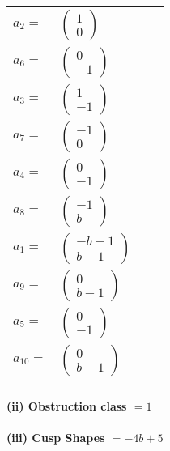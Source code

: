 \documentclass[1p]{elsarticle_modified}
\theoremstyle{definition}
\begin{document}
\begin{tabular}{m{7pt} m{180pt} m{7pt} m{180pt} }
\flushright $a_{2}=$&$\begin{pmatrix}1\\0\end{pmatrix}$ \\
\flushright $a_{6}=$&$\begin{pmatrix}0\\-1\end{pmatrix}$ \\
\flushright $a_{3}=$&$\begin{pmatrix}1\\-1\end{pmatrix}$ \\
\flushright $a_{7}=$&$\begin{pmatrix}-1\\0\end{pmatrix}$ \\
\flushright $a_{4}=$&$\begin{pmatrix}0\\-1\end{pmatrix}$ \\
\flushright $a_{8}=$&$\begin{pmatrix}-1\\b\end{pmatrix}$ \\
\flushright $a_{1}=$&$\begin{pmatrix}- b+1\\b-1\end{pmatrix}$ \\
\flushright $a_{9}=$&$\begin{pmatrix}0\\b-1\end{pmatrix}$ \\
\flushright $a_{5}=$&$\begin{pmatrix}0\\-1\end{pmatrix}$ \\
\flushright $a_{10}=$&$\begin{pmatrix}0\\b-1\end{pmatrix}$\\&\end{tabular}
\flushleft \textbf{(ii) Obstruction class $= 1$}\\~\\
\flushleft \textbf{(iii) Cusp Shapes $= -4 b+5$}\\~\\
\end{document}
